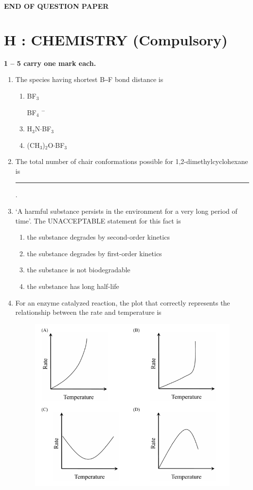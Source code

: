 \documentclass[journal,12pt,onecolumn]{IEEEtran}
\begin{document}
\begin{center}
\textbf{END OF QUESTION PAPER}
\end{center}
\newpage
\section*{\centering H : CHEMISTRY (Compulsory)}
\noindent \textbf{ 1 --  5 carry one mark each.}
\begin{enumerate}[label=\arabic*.]

\item The species having shortest B‒F bond distance is
\begin{multicols}{4}
\begin{enumerate}[label=(\Alph*)]
\item BF$_3$
\item [BF$_4$]$^-$
\item H$_3$N$\cdot$BF$_3$
\item (CH$_3$)$_2$O$\cdot$BF$_3$
\end{enumerate}
\end{multicols}

\item The total number of chair conformations possible for 1,2-dimethylcyclohexane is \rule{2.5cm}{0.1pt}.

\item ‘A harmful substance persists in the environment for a very long period of time’. The UNACCEPTABLE statement for this fact is
\begin{enumerate}[label=(\Alph*)]
\item the substance degrades by second-order kinetics
\item the substance degrades by first-order kinetics
\item the substance is not biodegradable
\item the substance has long half-life
\end{enumerate}

\item For an enzyme catalyzed reaction, the plot that correctly represents the relationship between the rate and temperature is

\begin{figure}[H]
    \centering
    \includegraphics[width=0.7\columnwidth]{FIG/H-4.png}
    \caption*{}
    \label{fig:H-4}
\end{figure}


\end{enumerate}
\end{document}
